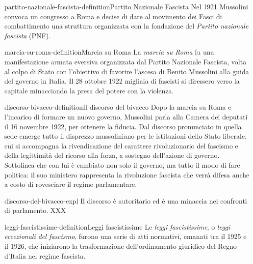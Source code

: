 \documentclass[preview]{standalone}
\begin{document}
\begin{snippetdefinition}{partito-nazionale-fascista-definition}{Partito Nazionale Fascista}
    Nel 1921 Mussolini convoca un congresso a Roma e decise di dare al movimento dei
    Fasci di combattimento una struttura organizzata con la fondazione del
    \textit{Partito nazionale fascista} (PNF).
\end{snippetdefinition}

\begin{snippetdefinition}{marcia-su-roma-definition}{Marcia su Roma}
    La \textit{marcia su Roma} fu una manifestazione armata eversiva
    organizzata dal Partito Nazionale Fascista, volta al colpo di Stato con
    l'obiettivo di favorire l'ascesa di Benito Mussolini
    alla guida del governo in Italia.
    Il 28 ottobre 1922 migliaia di fascisti si diressero verso la
    capitale minacciando la presa del potere con la violenza. 
\end{snippetdefinition}

\begin{snippetdefinition}{discorso-bivacco-definition}{Il discorso del bivacco}
    Dopo la marcia su Roma e l'incarico di formare un nuovo governo, Mussolini parla alla Camera
    dei deputati il 16 novembre 1922, per ottenere la fiducia. Dal discorso pronunciato in quella
    sede emerge tutto il disprezzo mussoliniano per le istituzioni dello Stato liberale, cui si
    accompagna la rivendicazione del carattere rivoluzionario del fascismo e della legittimità del
    ricorso alla forza, a sostegno dell'azione di governo. Sottolinea che con lui è cambiato non solo
    il governo, ma tutto il modo di fare politica: il suo ministero rappresenta la rivoluzione fascista
    che verrà difesa anche a costo di rovesciare il regime parlamentare.
\end{snippetdefinition}

\begin{snippet}{discorso-del-bivacco-expl}
    Il discorso è autoritario ed è una minaccia nei confronti di parlamento.
    XXX
\end{snippet}


\begin{snippetdefinition}{leggi-fascistissime-definition}{Leggi fascistissime}
    Le \textit{leggi fascistissime}, o \textit{leggi eccezionali del fascismo},
    furono una serie di atti normativi, emanati tra il 1925 e il 1926,
    che iniziarono la trasformazione dell'ordinamento giuridico del Regno d'Italia
    nel regime fascista.
\end{snippetdefinition}
\end{document}
